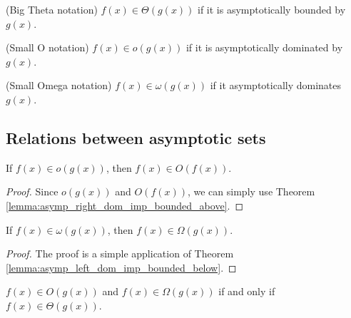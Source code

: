 \begin{definition}(Big Theta notation)
    \label{def:big_theta}
    \leanok
    $f(x) \in \Theta(g(x))$ if it is asymptotically bounded by $g(x)$. 
\end{definition}

\begin{definition}(Small O notation)
    \label{def:small_o}
    \leanok
    $f(x) \in o(g(x))$ if it is asymptotically dominated by $g(x)$.
\end{definition}

\begin{definition}(Small Omega notation)
    \label{def:small_omega}
    \leanok
    $f(x) \in \omega(g(x))$ if it asymptotically dominates $g(x)$.
\end{definition}


\subsection{Relations between asymptotic sets}

\begin{lemma}
    \label{lemma:small_o_imp_big_o}
    \leanok
    If $f(x) \in o(g(x))$, then $f(x) \in O(f(x))$.
\end{lemma}

\begin{proof}
    \leanok
    Since $o(g(x))$ and $O(f(x))$, we can simply use Theorem 
    \ref{lemma:asymp_right_dom_imp_bounded_above}.
\end{proof}

\begin{theorem}
    \label{thm:small_omega_imp_big_omega}
    \leanok
    If $f(x) \in \omega(g(x))$, then $f(x) \in \Omega(g(x))$.
\end{theorem}

\begin{proof}
    \leanok
    The proof is a simple application of Theorem 
    \ref{lemma:asymp_left_dom_imp_bounded_below}.
\end{proof}

\begin{theorem}
    \label{thm:big_o_and_omega_iff_theta}
    \leanok
    $f(x) \in O(g(x))$ and $f(x) \in \Omega(g(x))$ if and only if $f(x) \in \Theta(g(x))$.
\end{theorem}

